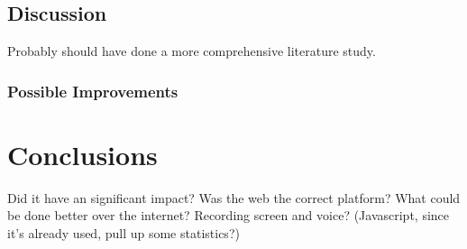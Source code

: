 \documentclass[nofilelist]{cslthse-msc}
\begin{document}
		\section{Discussion}

			Probably should have done a more comprehensive literature study. \\

			\subsection{Possible Improvements}

	\chapter{Conclusions}

		Did it have an significant impact? Was the web the correct platform? What
		could be done better over the internet? Recording screen and voice?
		(Javascript, since it's already used, pull up some statistics?)


	\checkoddpage
	\ifoddpage
	\else
		 \newpage
		 \thispagestyle{empty}
		 \mbox{ }
	\fi
\end{document}
